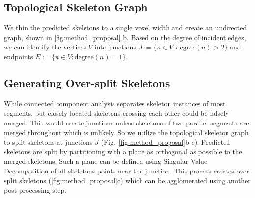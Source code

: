 \subsection{Topological Skeleton Graph}
We thin the predicted skeletons to a single voxel width and create an undirected graph, shown in \autoref{fig:method_proposal} b. Based on the degree of incident edges, we can identify the vertices $V$ into junctions $J := \{n \in V : \text{degree}(n) > 2\}$ and endpoints $E := \{n \in V : \text{degree}(n) = 1\}$.

\subsection{Generating Over-split Skeletons}
While connected component analysis separates skeleton instances of most segments, but closely located skeletons crossing each other could be falsely merged. This would create junctions unless skeletons of two parallel segments are merged throughout which is unlikely. So we utilize the topological skeleton graph to split skeletons at junctions $J$ (Fig.~\ref{fig:method_proposal}b-c). Predicted skeletons are split by partitioning with a plane as orthogonal as possible to the merged skeletons. Such a plane can be defined using Singular Value Decomposition of all skeletons points near the junction. 
This process creates over-split skeletons (\autoref{fig:method_proposal}c) which can be agglomerated using another post-processing step.

